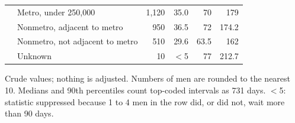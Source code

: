 \begin{table}[H]
\begin{tabular}{@{}llrrrr@{}}
 & Metro, under 250,000 & 1,120 & 35.0 & 70 & 179 \\
 & Nonmetro, adjacent to metro & 950 & 36.5 & 72 & 174.2 \\
 & Nonmetro, not adjacent to metro & 510 & 29.6 & 63.5 & 162 \\
 & Unknown & 10 & $<$5 & 77 & 212.7 \\
\bottomrule
\end{tabular}
\par\smallskip
\begin{minipage}{\linewidth}\scriptsize Crude values; nothing is adjusted. Numbers of men are rounded to the nearest 10. Medians and 90th percentiles count top-coded intervals as 731 days. $<$5: statistic suppressed because 1 to 4 men in the row did, or did not, wait more than 90 days.\end{minipage}
\end{table}
